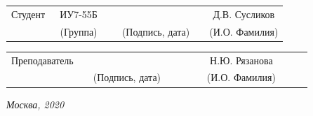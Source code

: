 \documentclass[14pt, a4paper]{extarticle}
\begin{document}
	
	\noindent
	\\
	
	\noindent
	\\
	
	\vspace{1.5cm}
	\noindent
	\begin{tabular}{l c c c c c}
		Студент      & ~ИУ7-55Б~               & \hspace{2.5cm} & \hspace{2cm}                 & &  Д.В. 
		Сусликов \\\cline{2-2}\cline{4-4} \cline{6-6} 
		\hspace{3cm} & {\footnotesize(Группа)} &                & {\footnotesize(Подпись, дата)} & & {\footnotesize(И.О. Фамилия)}
	\end{tabular}
	
	\noindent
	\begin{tabular}{l c c c c}
		Преподаватель & \hspace{5cm}   & \hspace{2cm}                 & & ~~~~~~Н.Ю. Рязанова~~~~~~\\\cline{3-3} \cline{5-5} 
		\hspace{3cm}  &                & {\footnotesize(Подпись, дата)} & & {\footnotesize(И.О. Фамилия)}
	\end{tabular}
	
	\vspace{0.6cm}
	\begin{center}	
		\vfill
		\large \textit {Москва, 2020}
	\end{center}
	
	\thispagestyle {empty}
	\pagebreak
	
	\clearpage
	\tableofcontents
	
	
	\clearpage
\end{document}
